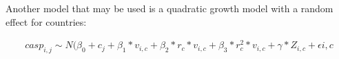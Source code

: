 \documentclass[10pt, letterpaper]{article}
\begin{document}
\begin{spacing}{1.4}
%
%
%
%
%
%

Another model that may be used is a quadratic growth model with a random effect for countries:
 
\begin{eqnarray}
	casp_{i,j}\sim N(\beta_{0}+ c_{j} +  \beta_{1}*v_{i,c} + \beta_{2}*r_{c}*v_{i,c}+\beta_{3}*r^{2}_{c}*v_{i,c}+\gamma*Z_{i,c} + \epsilon{i,c}
 \end{eqnarray}
 
  


\end{spacing}
\end{document}
